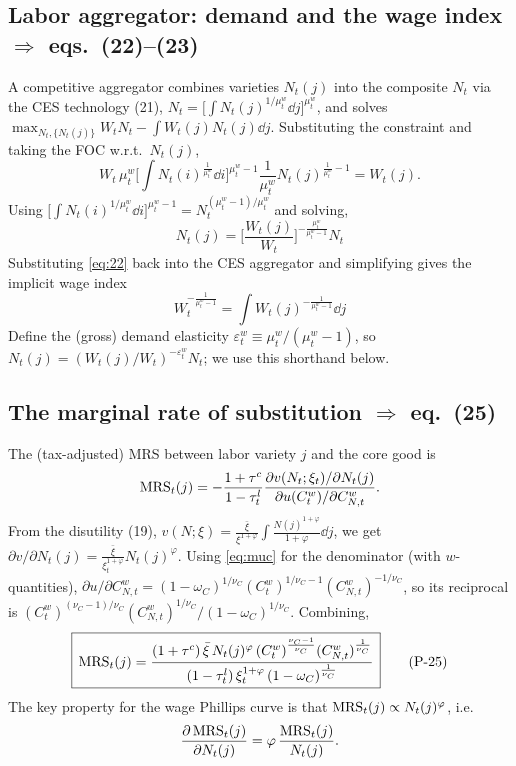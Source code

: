 \subsection{Labor aggregator: demand and the wage index \texorpdfstring{$\Rightarrow$}{=>} eqs.\ (22)--(23)}
A competitive aggregator combines varieties $N_t(j)$ into the composite $N_t$ via the CES technology
(21), $N_t=\big[\int N_t(j)^{1/\mu^w_t}\dd j\big]^{\mu^w_t}$, and solves
$\max_{N_t,\{N_t(j)\}}W_tN_t-\int W_t(j)N_t(j)\dd j$. Substituting the constraint and taking the FOC
w.r.t.\ $N_t(j)$,
\[
W_t\,\mu^w_t\Big[\!\int\! N_t(i)^{\frac1{\mu^w_t}}\dd i\Big]^{\mu^w_t-1}\frac{1}{\mu^w_t}N_t(j)^{\frac1{\mu^w_t}-1}=W_t(j).
\]
Using $\big[\int N_t(i)^{1/\mu^w_t}\dd i\big]^{\mu^w_t-1}=N_t^{(\mu^w_t-1)/\mu^w_t}$ and solving,
\begin{equation}\label{eq:22}
\boxed{\,N_t(j)=\Big[\frac{W_t(j)}{W_t}\Big]^{-\frac{\mu^w_t}{\mu^w_t-1}}N_t\,}\tag{P-22}
\end{equation}
Substituting \eqref{eq:22} back into the CES aggregator and simplifying gives the implicit wage index
\begin{equation}\label{eq:23}
\boxed{\,W_t^{-\frac{1}{\mu^w_t-1}}=\int W_t(j)^{-\frac{1}{\mu^w_t-1}}\dd j\,}\tag{P-23}
\end{equation}
Define the (gross) demand elasticity $\varepsilon^w_t\equiv \mu^w_t/(\mu^w_t-1)$, so
$N_t(j)=(W_t(j)/W_t)^{-\varepsilon^w_t}N_t$; we use this shorthand below.

\subsection{The marginal rate of substitution \texorpdfstring{$\Rightarrow$}{=>} eq.\ (25)}
The (tax-adjusted) MRS between labor variety $j$ and the core good is
\[
\operatorname{MRS}_t(j)=-\frac{1+\tau^c}{1-\tau^l_t}\frac{\partial v(N_t;\xi_t)/\partial N_t(j)}{\partial u(C^w_t)/\partial C^w_{N,t}} .
\]
From the disutility (19), $v(N;\xi)=\frac{\bar\xi}{\xi^{1+\varphi}}\int\frac{N(j)^{1+\varphi}}{1+\varphi}\dd j$,
we get $\partial v/\partial N_t(j)=\frac{\bar\xi}{\xi_t^{1+\varphi}}N_t(j)^\varphi$. Using \eqref{eq:muc}
for the denominator (with $w$-quantities), $\partial u/\partial C^w_{N,t}
=(1-\omega_C)^{1/\nu_C}(C^w_t)^{1/\nu_C-1}(C^w_{N,t})^{-1/\nu_C}$, so its reciprocal is
$(C^w_t)^{(\nu_C-1)/\nu_C}(C^w_{N,t})^{1/\nu_C}/(1-\omega_C)^{1/\nu_C}$. Combining,
\begin{equation}\label{eq:25}
\boxed{\,\operatorname{MRS}_t(j)=\frac{(1+\tau^c)\,\bar\xi\,N_t(j)^\varphi\,(C^w_t)^{\frac{\nu_C-1}{\nu_C}}(C^w_{N,t})^{\frac1{\nu_C}}}
{(1-\tau^l_t)\,\xi_t^{1+\varphi}\,(1-\omega_C)^{\frac1{\nu_C}}}\,}\tag{P-25}
\end{equation}
The key property for the wage Phillips curve is that $\operatorname{MRS}_t(j)\propto N_t(j)^{\varphi}$, i.e.
\begin{equation}\label{eq:mrs-elast}
\frac{\partial \operatorname{MRS}_t(j)}{\partial N_t(j)}=\varphi\,\frac{\operatorname{MRS}_t(j)}{N_t(j)} .
\end{equation}


